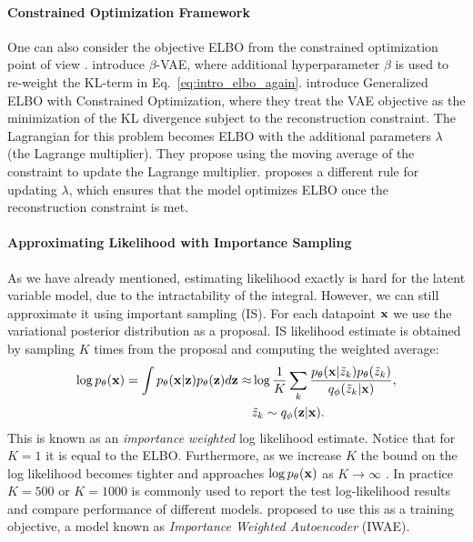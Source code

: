 \paragraph{Constrained Optimization Framework}
One can also consider the objective ELBO from the constrained optimization point of view \citep{higgins2017beta, rezende2018taming}. \citet{higgins2017beta} introduce $\beta$-VAE, where additional hyperparameter $\beta$ is used to re-weight the KL-term in Eq.~\ref{eq:intro_elbo_again}. \citet{rezende2018taming} introduce Generalized ELBO with Constrained Optimization, where they treat the VAE objective as the minimization of the KL divergence subject to the reconstruction constraint. The Lagrangian for this problem becomes ELBO with the additional parameters $\lambda$ (the Lagrange multiplier). They propose using the moving average of the constraint to update the Lagrange multiplier.
\citet{klushyn2019learning} proposes a different rule for updating $\lambda$, which ensures that the model optimizes ELBO once the reconstruction constraint is met. 

\paragraph{Approximating Likelihood with Importance Sampling}
As we have already mentioned, estimating likelihood exactly is hard for the latent variable model, due to the intractability of the integral. However, we can still approximate it using important sampling (IS). For each datapoint ${\mathbf{x}}$ we use the variational posterior distribution as a proposal. IS likelihood estimate is obtained by sampling $K$ times from the proposal and computing the weighted average:
\begin{equation}
\begin{aligned}
    \log p_{\theta}({\mathbf{x}}) = \int p_{\theta}({\mathbf{x}}|{\mathbf{z}})p_{\theta}({\mathbf{z}})d{\mathbf{z}} \approx &\log \frac1K \sum_k\frac{p_{\theta}({\mathbf{x}}|\tilde{z}_k)p_{\theta}(\tilde{z}_k)}{q_{\phi}(\tilde{z}_k|{\mathbf{x}})},\\
    &\tilde{z}_k \sim q_{\phi}({\mathbf{z}}|{\mathbf{x}}).
\end{aligned}
\end{equation}
This is known as an \textit{importance weighted} log likelihood estimate. Notice that for $K=1$ it is equal to the ELBO. Furthermore, as we increase $K$ the bound on the log likelihood becomes tighter and approaches $\log p_{\theta}({\mathbf{x}})$ as $K \rightarrow \infty$ \citep{burda2015importance}. In practice $K=500$ or $K=1000$ is commonly used to report the test log-likelihood results and compare performance of different models. \citet{burda2015importance} proposed to use this as a training objective, a model known as \textit{Importance Weighted Autoencoder} (IWAE). 

